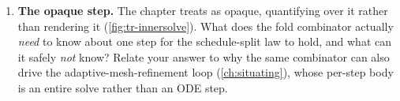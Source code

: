 \begin{enumerate}[nosep]
  (\cref{ch:reductions-pde}), why a single \emph{narrow} pulse in time lets one
  transient run recover a \emph{wide} band of the frequency response, whereas the
  driven analysis (\cref{ch:driven}) needs one solve per frequency. Give one situation
  where you would nonetheless prefer the driven sweep.
  \item \textbf{The opaque step.} The chapter treats  as opaque,
  quantifying over it rather than rendering it (\cref{fig:tr-innersolve}). What does
  the fold combinator actually \emph{need} to know about one step for the
  schedule-split law to hold, and what can it safely \emph{not} know? Relate your
  answer to why the same  combinator can also drive the
  adaptive-mesh-refinement loop (\cref{ch:situating}), whose per-step body is an
  entire solve rather than an ODE step.
\end{enumerate}
